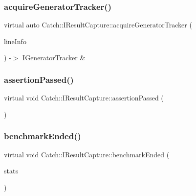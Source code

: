\subsubsection{\texorpdfstring{acquire\+Generator\+Tracker()}{acquireGeneratorTracker()}}
{\footnotesize\ttfamily virtual auto Catch\+::\+I\+Result\+Capture\+::acquire\+Generator\+Tracker (\begin{DoxyParamCaption}\item[{\mbox{\hyperlink{struct_catch_1_1_source_line_info}{Source\+Line\+Info}} const \&}]{line\+Info }\end{DoxyParamCaption}) -\/$>$  \mbox{\hyperlink{struct_catch_1_1_i_generator_tracker}{I\+Generator\+Tracker}} \&\hspace{0.3cm}{\ttfamily [pure virtual]}}

\mbox{\label{struct_catch_1_1_i_result_capture_a9b0ef2cb071e9a9dc6ec1b533026aea7}} 
\subsubsection{\texorpdfstring{assertion\+Passed()}{assertionPassed()}}
{\footnotesize\ttfamily virtual void Catch\+::\+I\+Result\+Capture\+::assertion\+Passed (\begin{DoxyParamCaption}{ }\end{DoxyParamCaption})\hspace{0.3cm}{\ttfamily [pure virtual]}}

\mbox{\label{struct_catch_1_1_i_result_capture_a6e5e64f9d94211a888249012ab6cc7fb}} 
\subsubsection{\texorpdfstring{benchmark\+Ended()}{benchmarkEnded()}}
{\footnotesize\ttfamily virtual void Catch\+::\+I\+Result\+Capture\+::benchmark\+Ended (\begin{DoxyParamCaption}\item[{Benchmark\+Stats const \&}]{stats }\end{DoxyParamCaption})\hspace{0.3cm}{\ttfamily [pure virtual]}}

